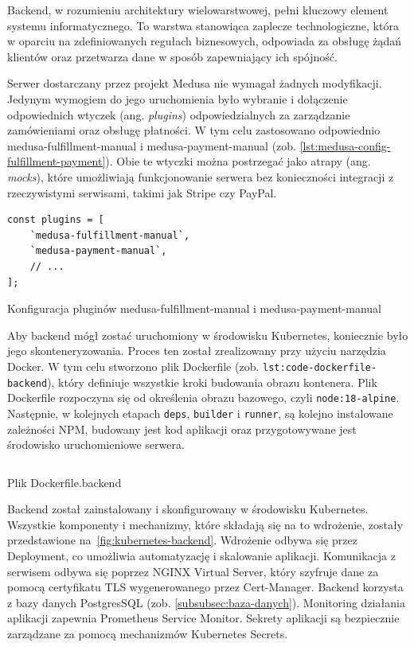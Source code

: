 Backend, w rozumieniu architektury wielowarstwowej, pełni kluczowy element systemu informatycznego.
To warstwa stanowiąca zaplecze technologiczne, która w oparciu na zdefiniowanych regułach biznesowych, odpowiada za obsługę żądań klientów oraz przetwarza dane w sposób zapewniający ich spójność.

Serwer dostarczany przez projekt Medusa nie wymagał żadnych modyfikacji.
Jedynym wymogiem do jego uruchomienia było wybranie i dołączenie odpowiednich wtyczek (ang. \emph{plugins}) odpowiedzialnych za zarządzanie zamówieniami oraz obsługę płatności.
W tym celu zastosowano odpowiednio medusa-fulfillment-manual i medusa-payment-manual (zob. \autoref{lst:medusa-config-fulfillment-payment}).
Obie te wtyczki można postrzegać jako atrapy (ang. \emph{mocks}), które umożliwiają funkcjonowanie serwera bez konieczności integracji z rzeczywistymi serwisami, takimi jak Stripe czy PayPal.

\begin{listing}[H]
    \begin{verbatim}
const plugins = [
    `medusa-fulfillment-manual`,
    `medusa-payment-manual`,
    // ...
];
    \end{verbatim}
    \caption{Konfiguracja pluginów medusa-fulfillment-manual i medusa-payment-manual}
    \label{lst:medusa-config-fulfillment-payment}
\end{listing}

Aby backend mógł zostać uruchomiony w środowisku Kubernetes, koniecznie było jego skonteneryzowania.
Proces ten został zrealizowany przy użyciu narzędzia Docker.
W tym celu stworzono plik Dockerfile (zob. \texttt{lst:code-dockerfile-backend}), który definiuje wszystkie kroki budowania obrazu kontenera.
Plik Dockerfile rozpoczyna się od określenia obrazu bazowego, czyli \texttt{node:18-alpine}.
Następnie, w kolejnych etapach \texttt{deps}, \texttt{builder} i \texttt{runner}, są kolejno instalowane zależności NPM, budowany jest kod aplikacji oraz przygotowywane jest środowisko uruchomieniowe serwera.

\begin{listing}[H]
    \inputminted[xleftmargin=20pt,linenos]{docker}{code/Dockerfile.backend}
    \caption{Plik Dockerfile.backend}
    \label{lst:code-dockerfile-backend}
\end{listing}

Backend został zainstalowany i skonfigurowany w środowisku Kubernetes.
Wszystkie komponenty i mechanizmy, które składają się na to wdrożenie, zostały przedstawione na~\autoref{fig:kubernetes-backend}.
Wdrożenie odbywa się przez Deployment, co umożliwia automatyzację i skalowanie aplikacji.
Komunikacja z serwisem odbywa się poprzez NGINX Virtual Server, który szyfruje dane za pomocą certyfikatu TLS wygenerowanego przez Cert-Manager.
Backend korzysta z bazy danych PostgresSQL (zob. \autoref{subsubsec:baza-danych}).
Monitoring działania aplikacji zapewnia Prometheus Service Monitor.
Sekrety aplikacji są bezpiecznie zarządzane za pomocą mechanizmów Kubernetes Secrets.

